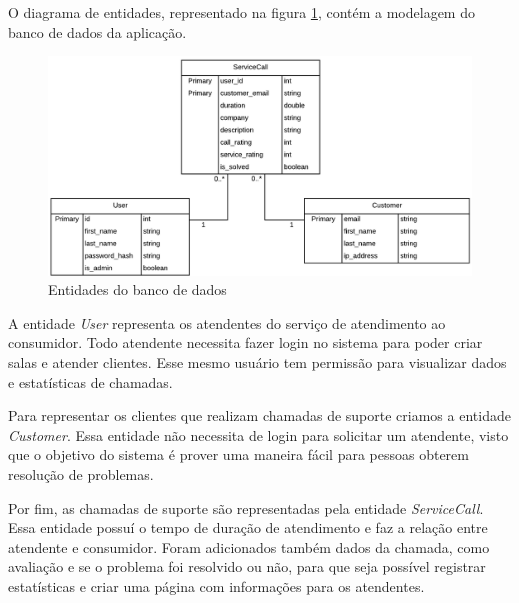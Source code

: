 O diagrama de entidades, representado na figura \ref{fig:database_model}, contém a modelagem do banco de dados da aplicação. 

\begin{figure}[ht!]
	\centering
		\includegraphics[scale=0.8]{figures/database-model.png} 
	\caption{Entidades do banco de dados}
	\label{fig:database_model}
\end{figure}

A entidade \textit{User} representa os atendentes do serviço de atendimento ao consumidor. Todo atendente necessita fazer login no sistema para poder criar salas e atender clientes. Esse mesmo usuário tem permissão para visualizar dados e estatísticas de chamadas.

Para representar os clientes que realizam chamadas de suporte criamos a entidade \textit{Customer}. Essa entidade não necessita de login para solicitar um atendente, visto que o objetivo do sistema é prover uma maneira fácil para pessoas obterem resolução de problemas.

Por fim, as chamadas de suporte são representadas pela entidade \textit{ServiceCall}. Essa entidade possuí o tempo de duração de atendimento e faz a relação entre atendente e consumidor. Foram adicionados também dados da chamada, como avaliação e se o problema foi resolvido ou não, para que seja possível registrar estatísticas e criar uma página com informações para os atendentes.

